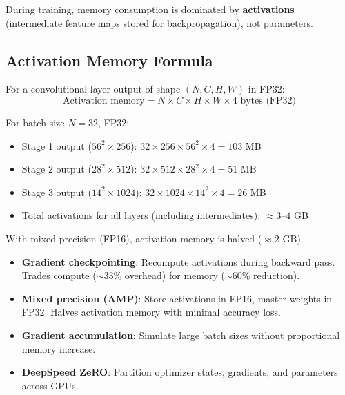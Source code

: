 During training, memory consumption is dominated by \textbf{activations} (intermediate feature maps stored for backpropagation), not parameters.

\subsection{Activation Memory Formula}

For a convolutional layer output of shape $(N, C, H, W)$ in FP32:
\begin{equation}
\text{Activation memory} = N \times C \times H \times W \times 4 \text{ bytes (FP32)}
\end{equation}

\begin{example}
For batch size $N = 32$, FP32:
\begin{itemize}
    \item Stage 1 output ($56^2 \times 256$): $32 \times 256 \times 56^2 \times 4 = 103$ MB
    \item Stage 2 output ($28^2 \times 512$): $32 \times 512 \times 28^2 \times 4 = 51$ MB
    \item Stage 3 output ($14^2 \times 1024$): $32 \times 1024 \times 14^2 \times 4 = 26$ MB
    \item Total activations for all layers (including intermediates): $\approx 3$--$4$ GB
\end{itemize}
With mixed precision (FP16), activation memory is halved ($\approx 2$ GB).
\end{example}

\begin{properties}
\begin{itemize}
    \item \textbf{Gradient checkpointing}: Recompute activations during backward pass. Trades compute ($\sim$33\% overhead) for memory ($\sim$60\% reduction).
    \item \textbf{Mixed precision (AMP)}: Store activations in FP16, master weights in FP32. Halves activation memory with minimal accuracy loss.
    \item \textbf{Gradient accumulation}: Simulate large batch sizes without proportional memory increase.
    \item \textbf{DeepSpeed ZeRO}: Partition optimizer states, gradients, and parameters across GPUs.
\end{itemize}
\end{properties}

